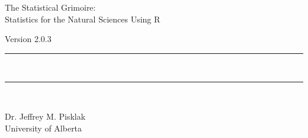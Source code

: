 {}
{
\Huge\centering\headingfont The Statistical Grimoire: \\
Statistics for the Natural Sciences Using R\\

\vspace{0.5em}

\small\mdseries\raggedright Version 2.0.3

\rule{\linewidth}{1pt}\\[-6mm]
\rule{\linewidth}{2pt}\\

}

\vskip 2cm

\begin{center}
\Large Dr. Jeffrey M. Pisklak \\
\vspace{0.5em}
\large University of Alberta
\end{center}

\vfill

